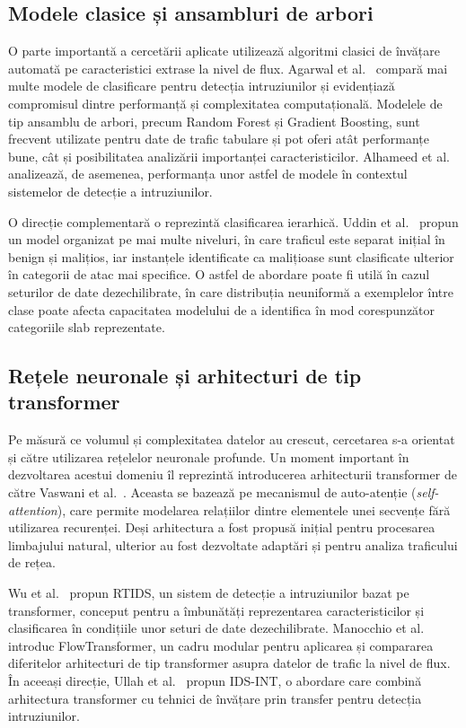 \subsection{Modele clasice și ansambluri de arbori}\label{subsec:clasice}

O parte importantă a cercetării aplicate utilizează algoritmi clasici de învățare automată pe caracteristici extrase la nivel de flux. Agarwal et al.~\cite{agarwal2021classification} compară mai multe modele de clasificare pentru detecția intruziunilor și evidențiază compromisul dintre performanță și complexitatea computațională. Modelele de tip ansamblu de arbori, precum Random Forest și Gradient Boosting, sunt frecvent utilizate pentru date de trafic tabulare și pot oferi atât performanțe bune, cât și posibilitatea analizării importanței caracteristicilor. Alhameed et al.~\cite{alhameed2025enhancing} analizează, de asemenea, performanța unor astfel de modele în contextul sistemelor de detecție a intruziunilor.

O direcție complementară o reprezintă clasificarea ierarhică. Uddin et al.~\cite{uddin2024hierarchical} propun un model organizat pe mai multe niveluri, în care traficul este separat inițial în benign și malițios, iar instanțele identificate ca malițioase sunt clasificate ulterior în categorii de atac mai specifice. O astfel de abordare poate fi utilă în cazul seturilor de date dezechilibrate, în care distribuția neuniformă a exemplelor între clase poate afecta capacitatea modelului de a identifica în mod corespunzător categoriile slab reprezentate.

\subsection{Rețele neuronale și arhitecturi de tip transformer}\label{subsec:neuronale}

Pe măsură ce volumul și complexitatea datelor au crescut, cercetarea s-a orientat și către utilizarea rețelelor neuronale profunde. Un moment important în dezvoltarea acestui domeniu îl reprezintă introducerea arhitecturii transformer de către Vaswani et al.~\cite{vaswani2017attention}. Aceasta se bazează pe mecanismul de auto-atenție (\textit{self-attention}), care permite modelarea relațiilor dintre elementele unei secvențe fără utilizarea recurenței. Deși arhitectura a fost propusă inițial pentru procesarea limbajului natural, ulterior au fost dezvoltate adaptări și pentru analiza traficului de rețea.

Wu et al.~\cite{wu2022rtids} propun RTIDS, un sistem de detecție a intruziunilor bazat pe transformer, conceput pentru a îmbunătăți reprezentarea caracteristicilor și clasificarea în condițiile unor seturi de date dezechilibrate. Manocchio et al.~\cite{manocchio2024flowtransformer} introduc FlowTransformer, un cadru modular pentru aplicarea și compararea diferitelor arhitecturi de tip transformer asupra datelor de trafic la nivel de flux. În aceeași direcție, Ullah et al.~\cite{ullah2024idsint} propun IDS-INT, o abordare care combină arhitectura transformer cu tehnici de învățare prin transfer pentru detecția intruziunilor.

